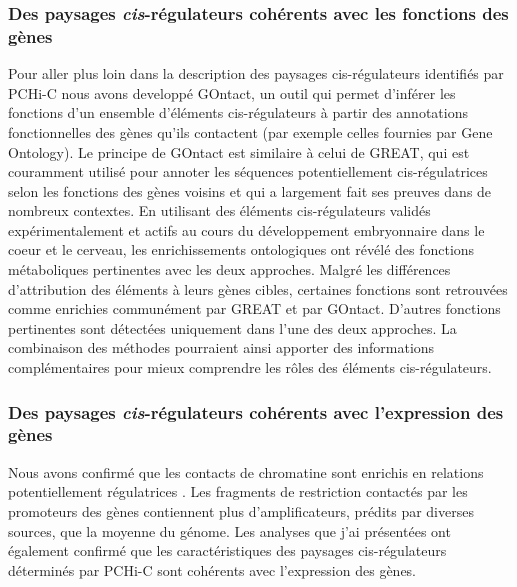 \subsubsection*{Des paysages \textit{cis}-régulateurs cohérents avec les fonctions des gènes}

Pour aller plus loin dans la description des paysages \gls{cis}-régulateurs identifiés par \acrshort{PCHi-C} nous avons developpé GOntact, un outil qui permet d’inférer les fonctions d'un ensemble d'éléments \gls{cis}-régulateurs à partir des annotations fonctionnelles des gènes qu’ils contactent (par exemple celles fournies par Gene Ontology). Le principe de GOntact est similaire à celui de GREAT, qui est couramment utilisé pour annoter les séquences potentiellement \gls{cis}-régulatrices selon les fonctions des gènes voisins et qui a largement fait ses preuves dans de nombreux contextes. En utilisant des éléments \gls{cis}-régulateurs validés expérimentalement et actifs au cours du développement embryonnaire dans le coeur et le cerveau, les enrichissements ontologiques ont révélé des fonctions métaboliques pertinentes avec les deux approches. Malgré les différences d’attribution des éléments à leurs gènes cibles, certaines fonctions sont retrouvées comme enrichies communément par GREAT et par GOntact. D'autres fonctions pertinentes sont détectées uniquement dans l'une des deux approches. La combinaison des méthodes pourraient ainsi apporter des informations complémentaires pour mieux comprendre les rôles des éléments \gls{cis}-régulateurs.

\subsubsection*{Des paysages \textit{cis}-régulateurs cohérents avec l'expression des gènes}
Nous avons confirmé que les contacts de chromatine sont enrichis en relations potentiellement régulatrices \citep{mifsud_mapping_2015, schoenfelder_pluripotent_2015, javierre_lineage-specific_2016}. Les fragments de restriction contactés par les promoteurs des gènes contiennent plus d’amplificateurs, prédits par diverses sources, que la moyenne du génome. Les analyses que j’ai présentées ont également confirmé que les caractéristiques des paysages \gls{cis}-régulateurs déterminés par \acrshort{PCHi-C} sont cohérents avec l’expression des gènes. \\

